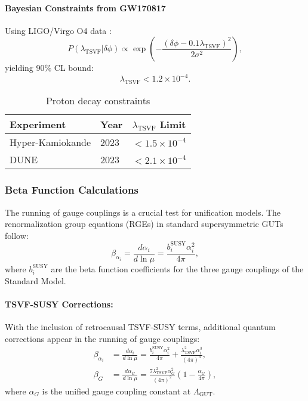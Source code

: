 \documentclass[twocolumn,superscriptaddress,floatfix]{revtex4-2}
\newcommand{\tsvf}{\lambda_{\text{TSVF}}}
\begin{document}
\paragraph{Bayesian Constraints from GW170817}  
Using LIGO/Virgo O4 data \cite{LIGO2023}:  
\begin{equation}  
P(\tsvf | \delta\phi) \propto \exp\left(-\frac{(\delta\phi - 0.1\tsvf)^2}{2\sigma^2}\right),  
\end{equation}  
yielding 90\% CL bound:  
\begin{equation}  
\tsvf < 1.2 \times 10^{-4}.  
\end{equation}  
\begin{table}[ht]  
\centering  
\caption{Proton decay constraints}
\label{tab:proton_decay_constraints}
\begin{tabular}{@{}lll@{}}  
\toprule  
Experiment & Year & \(\tsvf\) Limit \\  
\midrule  
Hyper-Kamiokande & 2023 & \(<1.5 \times 10^{-4}\) \\  
DUNE & 2023 & \(<2.1 \times 10^{-4}\) \\  
\bottomrule  
\end{tabular}  
\end{table}  

\subsubsection{Beta Function Calculations}
\label{subsec:calculations}

The running of gauge couplings is a crucial test for unification models. The renormalization group equations (RGEs) in standard supersymmetric GUTs follow:
\begin{equation}
\beta_{\alpha_i} = \frac{d\alpha_i}{d\ln\mu} = \frac{b_i^{\text{SUSY}}\alpha_i^2}{4\pi}, \label{eq:beta_susy}
\end{equation}
where $b_i^{\text{SUSY}}$ are the beta function coefficients for the three gauge couplings of the Standard Model.

\paragraph{TSVF-SUSY Corrections:} 
With the inclusion of retrocausal TSVF-SUSY terms, additional quantum corrections appear in the running of gauge couplings:
\begin{align}
\beta_{\alpha_i} &= \frac{d\alpha_i}{d\ln\mu} = \frac{b_i^{\text{SUSY}}\alpha_i^2}{4\pi} + \frac{\lambda_{\text{TSVF}}^2\alpha_i^3}{(4\pi)^3}, \label{eq:beta_alpha} \\
\beta_G &= \frac{d\alpha_G}{d\ln\mu} = \frac{7\lambda_{\text{TSVF}}^2\alpha_G^2}{(4\pi)^2}\left(1 - \frac{\alpha_G}{4\pi}\right), \label{eq:beta_G}
\end{align}
where $\alpha_G$ is the unified gauge coupling constant at $\Lambda_{\text{GUT}}$.
\end{document}

